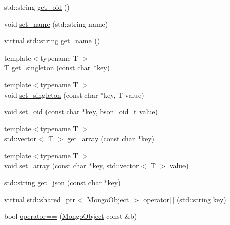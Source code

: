 \begin{DoxyCompactItemize}
std\+::string \hyperlink{class_mongo_object_ad155a8808f999f8e3dd0cfc055b33e2a}{get\+\_\+oid} ()
\item 
void \hyperlink{class_mongo_object_ac999ffe6b9b2ca261adff1eaf9da7e98}{set\+\_\+name} (std\+::string name)
\item 
virtual std\+::string \hyperlink{class_mongo_object_abd49d2dcea0ce5f49ebe9a8a9df97164}{get\+\_\+name} ()
\item 
{\footnotesize template$<$typename T $>$ }\\T \hyperlink{class_mongo_object_af0cf1568e5b1b87a971e93bba4ec0a40}{get\+\_\+singleton} (const char $\ast$key)
\item 
{\footnotesize template$<$typename T $>$ }\\void \hyperlink{class_mongo_object_a03a0d78b1f206aca81ff746edcd57c81}{set\+\_\+singleton} (const char $\ast$key, T value)
\item 
void \hyperlink{class_mongo_object_a9e80e38e5a4f40754ef48f2504e1613c}{set\+\_\+oid} (const char $\ast$key, bson\+\_\+oid\+\_\+t value)
\item 
{\footnotesize template$<$typename T $>$ }\\std\+::vector$<$ T $>$ \hyperlink{class_mongo_object_ae1002573afb58658162fb7f53cd0bffc}{get\+\_\+array} (const char $\ast$key)
\item 
{\footnotesize template$<$typename T $>$ }\\void \hyperlink{class_mongo_object_ac251f38eef739fb9e1418a20e7fcc7f7}{set\+\_\+array} (const char $\ast$key, std\+::vector$<$ T $>$ value)
\item 
std\+::string \hyperlink{class_mongo_object_a9f71ae755dac1db3e37cdee85329d163}{get\+\_\+json} (const char $\ast$key)
\item 
virtual std\+::shared\+\_\+ptr$<$ \hyperlink{class_mongo_object}{Mongo\+Object} $>$ \hyperlink{class_mongo_object_a89f7e282816b6dd93d4df4ee7ca9bd0a}{operator\mbox{[}$\,$\mbox{]}} (std\+::string key)
\item 
bool \hyperlink{class_mongo_object_a0050194f5bc8690e0db3b8217086e421}{operator==} (\hyperlink{class_mongo_object}{Mongo\+Object} const \&b)
\end{DoxyCompactItemize}
